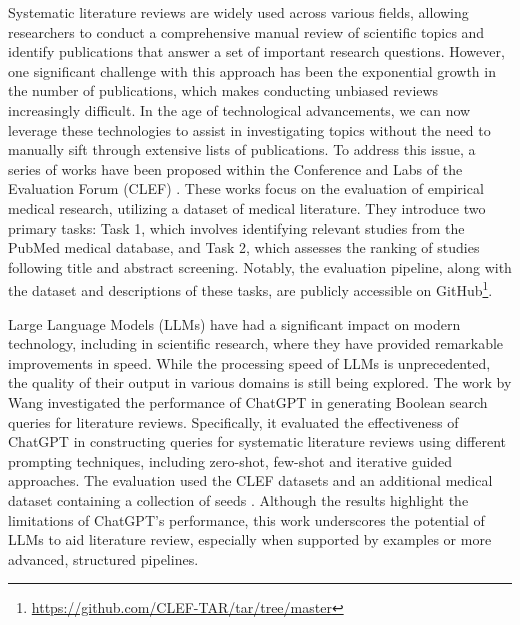 Systematic literature reviews are widely used across various fields, allowing researchers to conduct a comprehensive manual review of scientific topics and identify publications that answer a set of important research questions. However, one significant challenge with this approach has been the exponential growth in the number of publications, which makes conducting unbiased reviews increasingly difficult. In the age of technological advancements, we can now leverage these technologies to assist in investigating topics without the need to manually sift through extensive lists of publications. To address this issue, a series of works have been proposed within the Conference and Labs of the Evaluation Forum (CLEF) \autocite{kanoulas2017clef, kanoulas2018clef, kanoulas2019clef}. These works focus on the evaluation of empirical medical research, utilizing a dataset of medical literature. They introduce two primary tasks: Task 1, which involves identifying relevant studies from the PubMed medical database, and Task 2, which assesses the ranking of studies following title and abstract screening. Notably, the evaluation pipeline, along with the dataset and descriptions of these tasks, are publicly accessible on GitHub\footnote{\url{https://github.com/CLEF-TAR/tar/tree/master}}.

Large Language Models (LLMs) have had a significant impact on modern technology, including in scientific research, where they have provided remarkable improvements in speed. While the processing speed of LLMs is unprecedented, the quality of their output in various domains is still being explored. The work by Wang \autocite{wang2023can} investigated the performance of ChatGPT in generating Boolean search queries for literature reviews. Specifically, it evaluated the effectiveness of ChatGPT in constructing queries for systematic literature reviews using different prompting techniques, including zero-shot, few-shot and iterative guided approaches. The evaluation used the CLEF datasets \autocite{kanoulas2017clef, kanoulas2018clef, kanoulas2019clef} and an additional medical dataset containing a collection of seeds \autocite{Wang_2022}. Although the results highlight the limitations of ChatGPT's performance, this work underscores the potential of LLMs to aid literature review, especially when supported by examples or more advanced, structured pipelines.

